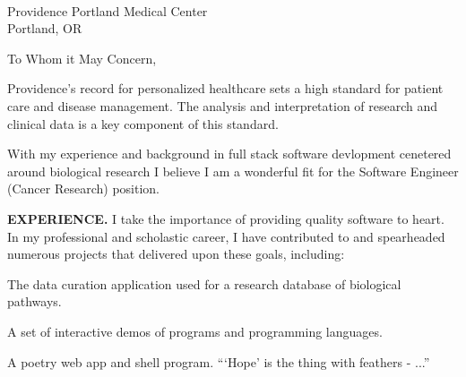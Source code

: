



\textcolor{my-grey}{\dotfill}
\bigbreak

{\DTMtoday}\\
Providence Portland Medical Center\\
Portland, OR

\vspace*{2\baselineskip}

To Whom it May Concern,

\vspace*{\baselineskip}

Providence's record for personalized healthcare sets a high standard for patient care and disease management. The analysis and interpretation of research and clinical data is a key component of this standard.

\vspace*{\baselineskip}

With my experience and background in full stack software devlopment cenetered around biological research I believe I am a wonderful fit for the Software Engineer (Cancer Research) position.

\vspace*{\baselineskip}

\textbf{EXPERIENCE.} I take the importance of providing quality software to heart. In my professional and scholastic career, I have contributed to and spearheaded numerous projects that delivered upon these goals, including:

\begin{itemize}[label=$\triangleright$]
The data curation application used for a research database of biological pathways.

A set of interactive demos of programs and programming languages.

A poetry web app and shell program. ```Hope' is the thing with feathers - ...''

\end{itemize}

\vspace*{\baselineskip}


